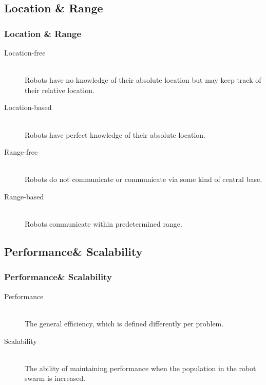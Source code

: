 \documentclass{beamer}
\begin{document}
\subsection{Location \& Range}
\begin{frame}\frametitle{\textbf{\LARGE{\textrm{Location \& Range}}}}
\begin{description}
  \item[Location-free]  \hfill \\ Robots have no knowledge of their absolute location but may keep track of their relative location.
  \item[Location-based]  \hfill \\Robots have perfect knowledge of their absolute location.
  \item[Range-free]  \hfill \\Robots do not communicate or communicate via some kind of central base.
  \item[Range-based]  \hfill \\Robots communicate within predetermined range.
\end{description}
\end{frame}
\subsection{Performance\& Scalability}
\begin{frame}\frametitle{\textbf{\LARGE{\textrm{Performance\& Scalability}}}}
\begin{description}
  \item[Performance] \hfill \\ The general efficiency, which is defined differently per problem.
  \item[Scalability] \hfill \\ The ability of maintaining performance when the population in the robot swarm is increased.
\end{description}
\end{frame}
\end{document}
